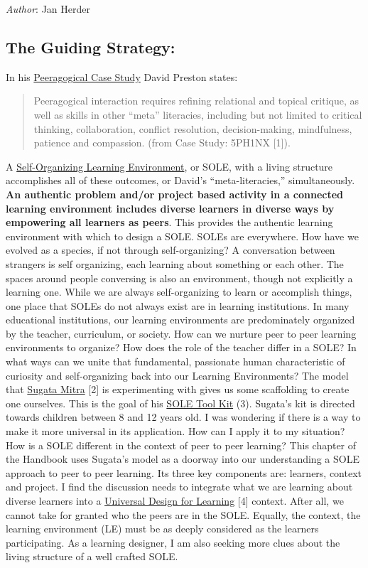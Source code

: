\emph{Author}: Jan Herder 

\subsection{The Guiding Strategy:}

In his \href{http://peeragogy.org/case-study-5ph1nx/}{Peeragogical Case
Study} David Preston states:

\begin{quote}
Peeragogical interaction requires refining relational and topical
critique, as well as skills in other ``meta'' literacies, including but
not limited to critical thinking, collaboration, conflict resolution,
decision-making, mindfulness, patience and compassion. (from Case Study:
5PH1NX {[}1{]}).
\end{quote}

A
\href{http://en.wikipedia.org/wiki/Self\_Organised\_Learning\_Environment}{Self-Organizing
Learning Environment}, or SOLE, with a living structure accomplishes all
of these outcomes, or David's ``meta-literacies,'' simultaneously.
\textbf{An authentic problem and/or project based activity in a
connected learning environment includes diverse learners in diverse ways
by empowering all learners as peers}. This provides the authentic
learning environment with which to design a SOLE. SOLEs are everywhere.
How have we evolved as a species, if not through self-organizing? A
conversation between strangers is self organizing, each learning about
something or each other. The spaces around people conversing is also an
environment, though not explicitly a learning one. While we are always
self-organizing to learn or accomplish things, one place that SOLEs do
not always exist are in learning institutions. In many educational
institutions, our learning environments are predominately organized by
the teacher, curriculum, or society. How can we nurture peer to peer
learning environments to organize? How does the role of the teacher
differ in a SOLE? In what ways can we unite that fundamental, passionate
human characteristic of curiosity and self-organizing back into our
Learning Environments? The model that
\href{http://sugatam.wikispaces.com/}{Sugata Mitra} {[}2{]} is
experimenting with gives us some scaffolding to create one ourselves.
This is the goal of his
\href{http://www.ted.com/pages/sole\_toolkit}{SOLE Tool Kit} (3).
Sugata's kit is directed towards children between 8 and 12 years old. I
was wondering if there is a way to make it more universal in its
application. How can I apply it to my situation? How is a SOLE different
in the context of peer to peer learning? This chapter of the Handbook
uses Sugata's model as a doorway into our understanding a SOLE approach
to peer to peer learning. Its three key components are: learners,
context and project. I find the discussion needs to integrate what we
are learning about diverse learners into a
\href{http://www.udlcenter.org/aboutudl/udlguidelines}{Universal Design
for Learning} {[}4{]} context. After all, we cannot take for granted who
the peers are in the SOLE. Equally, the context, the learning
environment (LE) must be as deeply considered as the learners
participating. As a learning designer, I am also seeking more clues
about the living structure of a well crafted SOLE.


